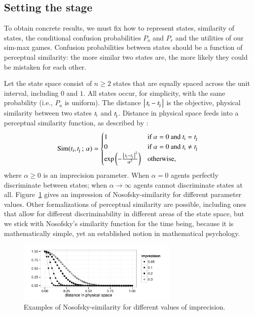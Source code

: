 \documentclass[fleqn,reqno,10pt]{article}
\newcommand{\imprecision}{\ensuremath{\alpha}} %
\newcommand{\similarity}{\ensuremath{\mathrm{Sim}}} %
\begin{document}
\subsection{Setting the stage}
\label{sec:setting-stage}

To obtain concrete results, we must fix how to represent states, similarity of states, the
conditional confusion probabilities $P_o$ and $P_r$ and the utilities of our sim-max
games. Confusion probabilities between states should be a function of perceptual similarity:
the more similar two states are, the more likely they could be mistaken for each other. 

Let the state space consist of $n \ge 2$ states that are equally spaced across the unit
interval, including $0$ and $1$. All states occur, for simplicity, with the same probability
(i.e., $P_a$ is uniform).  The distance $\left \lvert \, t_{\mathrm{i}} - t_{\mathrm{j}} \, \right\rvert$ is the objective,
physical similarity between two states $t_{\mathrm{i}}$ and $t_{\mathrm{j}}$. Distance in physical
space feeds into a perceptual similarity function, as described by
\citet{Nosofsky1986:Attention-Simil}:
\begin{align*}
  \similarity(\mystate{i}, \mystate{j} \myts ; \myts \imprecision) =
      \begin{cases}
    1 & \textrm{if } \imprecision = 0 \textrm{ and } \mystate{i} = \mystate{j} \\
    0 & \textrm{if } \imprecision = 0 \textrm{ and } \mystate{i} \neq \mystate{j} \\
 \expo \left ( -  \frac{\card{\mystate{i} - \mystate{j}}^2}{ \imprecision^2} \right ) & \textrm{otherwise,} \\
    \end{cases}
\end{align*}
where $\imprecision \ge 0$ is an imprecision parameter. When $\imprecision=0$ agents perfectly
discriminate between states; when $\imprecision \rightarrow \infty$ agents cannot discriminate
states at all. Figure~\ref{fig:NosofskySim} gives an impression of Nosofsky-similarity for
different parameter values. Other formalizations of perceptual similarity are possible,
including ones that allow for different discriminability in different areas of the state space,
but we stick with Nosofsky's similarity function for the time being, because it is
mathematically simple, yet an established notion in mathematical psychology.

\begin{figure}
  \centering

  \includegraphics[width=0.7\textwidth]{plots/NosofskySim.pdf}

  \caption{Examples of Nosofsky-similarity for different values of
    imprecision.}
  \label{fig:NosofskySim}
\end{figure}
\end{document}
